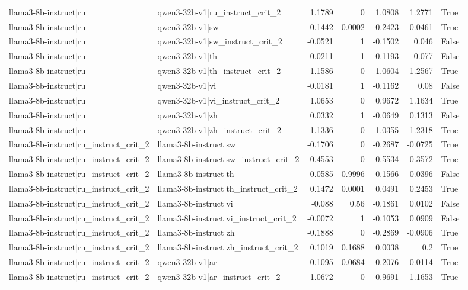 \begin{table}
\begin{tabular}{l l r r r r l}
llama3-8b-instruct|ru & qwen3-32b-v1|ru_instruct_crit_2 & 1.1789 & 0 & 1.0808 & 1.2771 & True \\
llama3-8b-instruct|ru & qwen3-32b-v1|sw & -0.1442 & 0.0002 & -0.2423 & -0.0461 & True \\
llama3-8b-instruct|ru & qwen3-32b-v1|sw_instruct_crit_2 & -0.0521 & 1 & -0.1502 & 0.046 & False \\
llama3-8b-instruct|ru & qwen3-32b-v1|th & -0.0211 & 1 & -0.1193 & 0.077 & False \\
llama3-8b-instruct|ru & qwen3-32b-v1|th_instruct_crit_2 & 1.1586 & 0 & 1.0604 & 1.2567 & True \\
llama3-8b-instruct|ru & qwen3-32b-v1|vi & -0.0181 & 1 & -0.1162 & 0.08 & False \\
llama3-8b-instruct|ru & qwen3-32b-v1|vi_instruct_crit_2 & 1.0653 & 0 & 0.9672 & 1.1634 & True \\
llama3-8b-instruct|ru & qwen3-32b-v1|zh & 0.0332 & 1 & -0.0649 & 0.1313 & False \\
llama3-8b-instruct|ru & qwen3-32b-v1|zh_instruct_crit_2 & 1.1336 & 0 & 1.0355 & 1.2318 & True \\
llama3-8b-instruct|ru_instruct_crit_2 & llama3-8b-instruct|sw & -0.1706 & 0 & -0.2687 & -0.0725 & True \\
llama3-8b-instruct|ru_instruct_crit_2 & llama3-8b-instruct|sw_instruct_crit_2 & -0.4553 & 0 & -0.5534 & -0.3572 & True \\
llama3-8b-instruct|ru_instruct_crit_2 & llama3-8b-instruct|th & -0.0585 & 0.9996 & -0.1566 & 0.0396 & False \\
llama3-8b-instruct|ru_instruct_crit_2 & llama3-8b-instruct|th_instruct_crit_2 & 0.1472 & 0.0001 & 0.0491 & 0.2453 & True \\
llama3-8b-instruct|ru_instruct_crit_2 & llama3-8b-instruct|vi & -0.088 & 0.56 & -0.1861 & 0.0102 & False \\
llama3-8b-instruct|ru_instruct_crit_2 & llama3-8b-instruct|vi_instruct_crit_2 & -0.0072 & 1 & -0.1053 & 0.0909 & False \\
llama3-8b-instruct|ru_instruct_crit_2 & llama3-8b-instruct|zh & -0.1888 & 0 & -0.2869 & -0.0906 & True \\
llama3-8b-instruct|ru_instruct_crit_2 & llama3-8b-instruct|zh_instruct_crit_2 & 0.1019 & 0.1688 & 0.0038 & 0.2 & True \\
llama3-8b-instruct|ru_instruct_crit_2 & qwen3-32b-v1|ar & -0.1095 & 0.0684 & -0.2076 & -0.0114 & True \\
llama3-8b-instruct|ru_instruct_crit_2 & qwen3-32b-v1|ar_instruct_crit_2 & 1.0672 & 0 & 0.9691 & 1.1653 & True \\

\end{tabular}
\end{table}

